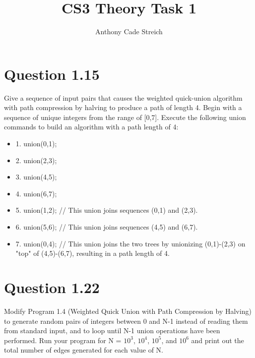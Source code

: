 \documentclass[]{article}
\title{CS3 Theory Task 1}
\author{Anthony Cade Streich}
\begin{document}
\maketitle
\section*{Question 1.15}
Give a sequence of input pairs that causes the weighted quick-union algorithm with path compression by halving to produce a path of length 4.
\newline
\newline
\newline
Begin with a sequence of unique integers from the range of [0,7]. Execute the following union commands to build an algorithm with a path length of 4:

\begin{itemize}
	\item {1. union(0,1);}
	\item {2. union(2,3);}
	\item {3. union(4,5);}
	\item {4. union(6,7);}
	
	\item {5. union(1,2); // This union joins sequences (0,1) and (2,3).}
	\item {6. union(5,6); // This union joins sequences (4,5) and (6,7).}
	\item {7. union(0,4); // This union joins the two trees by unionizing (0,1)-(2,3) on "top" of (4,5)-(6,7), resulting in a path length of 4.}
\end{itemize}

\pagebreak

\section*{Question 1.22}
Modify Program 1.4 (Weighted Quick Union with Path Compression by Halving) to generate random pairs of integers between 0 and N-1 instead of reading them from standard input, and to loop until N-1 union operations have been performed. Run your program for N = $10^{3}$, $10^{4}$, $10^{5}$, and $10^{6}$ and print out the total number of edges generated for each value of N.
\end{document}
